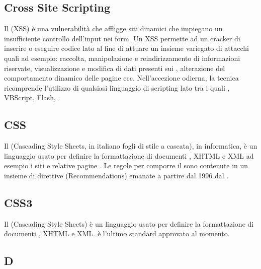 \subsection{Cross Site Scripting}
Il  (XSS) è una vulnerabilità che affligge siti  dinamici che impiegano un insufficiente controllo dell'input nei form. Un XSS permette ad un cracker di inserire o eseguire codice lato  al fine di attuare un insieme variegato di attacchi quali ad esempio: raccolta, manipolazione e reindirizzamento di informazioni riservate, visualizzazione e modifica di dati presenti sui , alterazione del comportamento dinamico delle pagine  ecc. Nell'accezione odierna, la tecnica ricomprende l'utilizzo di qualsiasi linguaggio di scripting lato  tra i quali , VBScript, Flash, .

\subsection{CSS}
Il  (Cascading Style Sheets, in italiano fogli di stile a cascata), in informatica, è un linguaggio usato per definire la formattazione di documenti , XHTML e XML ad esempio i siti  e relative pagine . Le regole per comporre il  sono contenute in un insieme di direttive (Recommendations) emanate a partire dal 1996 dal .

\subsection{CSS3}
Il  (Cascading Style Sheets) è un linguaggio usato per definire la formattazione di documenti , XHTML e XML.
 è l'ultimo standard approvato al momento.

\newpage

\begin{center}
\Huge\section{\uppercase{D}}
\end{center}

